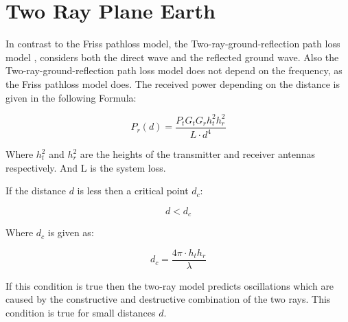 \section{Two Ray Plane Earth}
In contrast to the Friss pathloss model, the Two-ray-ground-reflection path loss model \citep{two_ray}, considers both the direct wave and the reflected ground wave. Also the Two-ray-ground-reflection path loss model does not depend on the frequency, as the Friss pathloss model does. The received power depending on the distance is given in the following Formula:

\begin{equation}
P_r(d) = \frac{P_t G_t G_r h^2_t h^2_r}{L \cdot d^4}
\label{two_ray_model}
\end{equation}

Where $h^2_t$ and $h^2_r$ are the heights of the transmitter and receiver antennas respectively. And L is the system loss. 

If the distance $d$ is less then a critical point $d_{c}$: 

\begin{equation}
d<d_{c}
\label{two_ray_cond}
\end{equation}

Where $d_{c}$ is given as:

\begin{equation}
d_{c} = \frac{4\pi \cdot h_t h_r}{\lambda}
\label{critical_fac_dc}
\end{equation}

If this condition is true then the two-ray model predicts oscillations which are caused by the constructive and destructive combination of the two rays. This condition is true for small distances $d$.











